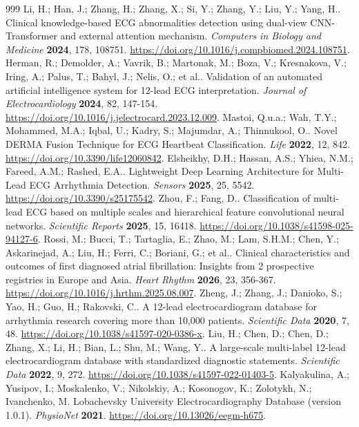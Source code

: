 \documentclass[life,article,submit,moreauthors]{Definitions/mdpi}
\begin{document}
\begin{thebibliography}{999}
Li, H.; Han, J.; Zhang, H.; Zhang, X.; Si, Y.; Zhang, Y.; Liu, Y.; Yang, H.. Clinical knowledge-based ECG abnormalities detection using dual-view CNN-Transformer and external attention mechanism. \emph{Computers in Biology and Medicine} \textbf{2024}, 178, 108751. \url{https://doi.org/10.1016/j.compbiomed.2024.108751}.
Herman, R.; Demolder, A.; Vavrik, B.; Martonak, M.; Boza, V.; Kresnakova, V.; Iring, A.; Palus, T.; Bahyl, J.; Nelis, O.; et al.. Validation of an automated artificial intelligence system for 12-lead ECG interpretation. \emph{Journal of Electrocardiology} \textbf{2024}, 82, 147-154. \url{https://doi.org/10.1016/j.jelectrocard.2023.12.009}.
Mastoi, Q.u.a.; Wah, T.Y.; Mohammed, M.A.; Iqbal, U.; Kadry, S.; Majumdar, A.; Thinnukool, O.. Novel DERMA Fusion Technique for ECG Heartbeat Classification. \emph{Life} \textbf{2022}, 12, 842. \url{https://doi.org/10.3390/life12060842}.
Elsheikhy, D.H.; Hassan, A.S.; Yhiea, N.M.; Fareed, A.M.; Rashed, E.A.. Lightweight Deep Learning Architecture for Multi-Lead ECG Arrhythmia Detection. \emph{Sensors} \textbf{2025}, 25, 5542. \url{https://doi.org/10.3390/s25175542}.
Zhou, F.; Fang, D.. Classification of multi-lead ECG based on multiple scales and hierarchical feature convolutional neural networks. \emph{Scientific Reports} \textbf{2025}, 15, 16418. \url{https://doi.org/10.1038/s41598-025-94127-6}.
Rossi, M.; Bucci, T.; Tartaglia, E.; Zhao, M.; Lam, S.H.M.; Chen, Y.; Askarinejad, A.; Liu, H.; Ferri, C.; Boriani, G.; et al.. Clinical characteristics and outcomes of first diagnosed atrial fibrillation: Insights from 2 prospective registries in Europe and Asia. \emph{Heart Rhythm} \textbf{2026}, 23, 356-367. \url{https://doi.org/10.1016/j.hrthm.2025.08.007}.
Zheng, J.; Zhang, J.; Danioko, S.; Yao, H.; Guo, H.; Rakovski, C.. A 12-lead electrocardiogram database for arrhythmia research covering more than 10,000 patients. \emph{Scientific Data} \textbf{2020}, 7, 48. \url{https://doi.org/10.1038/s41597-020-0386-x}.
Liu, H.; Chen, D.; Chen, D.; Zhang, X.; Li, H.; Bian, L.; Shu, M.; Wang, Y.. A large-scale multi-label 12-lead electrocardiogram database with standardized diagnostic statements. \emph{Scientific Data} \textbf{2022}, 9, 272. \url{https://doi.org/10.1038/s41597-022-01403-5}.
Kalyakulina, A.; Yusipov, I.; Moskalenko, V.; Nikolskiy, A.; Kosonogov, K.; Zolotykh, N.; Ivanchenko, M. Lobachevsky University Electrocardiography Database (version 1.0.1). \emph{PhysioNet} \textbf{2021}. \url{https://doi.org/10.13026/eegm-h675}.

\end{thebibliography}
\end{document}
